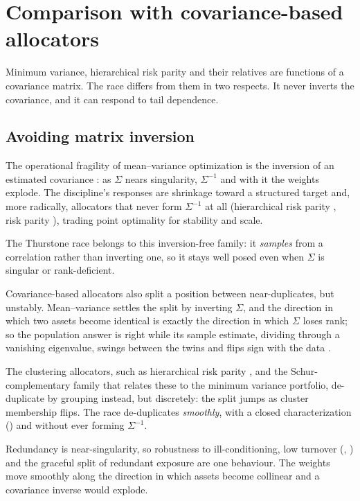 \section{Comparison with covariance-based allocators}
\label{sec:comparison}

Minimum variance, hierarchical risk parity and their relatives are functions of a
covariance matrix. The race differs from them in two respects. It never inverts
the covariance, and it can respond to tail dependence.

\subsection{Avoiding matrix inversion}
\label{sec:robust}

The operational fragility of mean--variance optimization is the inversion of an
estimated covariance \parencite{markowitz1952}: as $\Sigma$ nears singularity,
$\Sigma^{-1}$ and with it the weights explode.
The discipline's responses are
shrinkage toward a structured target \parencite{ledoitwolf2004} and, more
radically, allocators that never form $\Sigma^{-1}$ at all (hierarchical risk
parity \parencite{lopezdeprado2016}, risk parity \parencite{maillard2010}), trading point
optimality for stability and scale.

The Thurstone race belongs to this inversion-free family: it
\emph{samples} from a correlation rather than inverting one, so it stays well posed
even when $\Sigma$ is singular or rank-deficient.

Covariance-based allocators also split a position between near-duplicates, but
unstably. Mean--variance settles the split by inverting $\Sigma$, and the direction
in which two assets become identical is exactly the direction in which $\Sigma$
loses rank; so the population answer is right while its sample estimate, dividing
through a vanishing eigenvalue, swings between the twins and flips sign with the
data \parencite{markowitz1952}.

The clustering allocators, such as hierarchical risk parity
\parencite{lopezdeprado2016}, and the Schur-complementary family
\parencite{cotton2024schur} that relates these to the minimum variance portfolio,
de-duplicate by grouping instead, but discretely: the split jumps as cluster
membership flips. The race de-duplicates \emph{smoothly}, with a closed
characterization () and without ever forming $\Sigma^{-1}$.

Redundancy is near-singularity, so robustness to ill-conditioning, low turnover
(, ) and the graceful split of redundant
exposure are one behaviour. The weights move smoothly along the direction in which
assets become collinear and a covariance inverse would explode.

